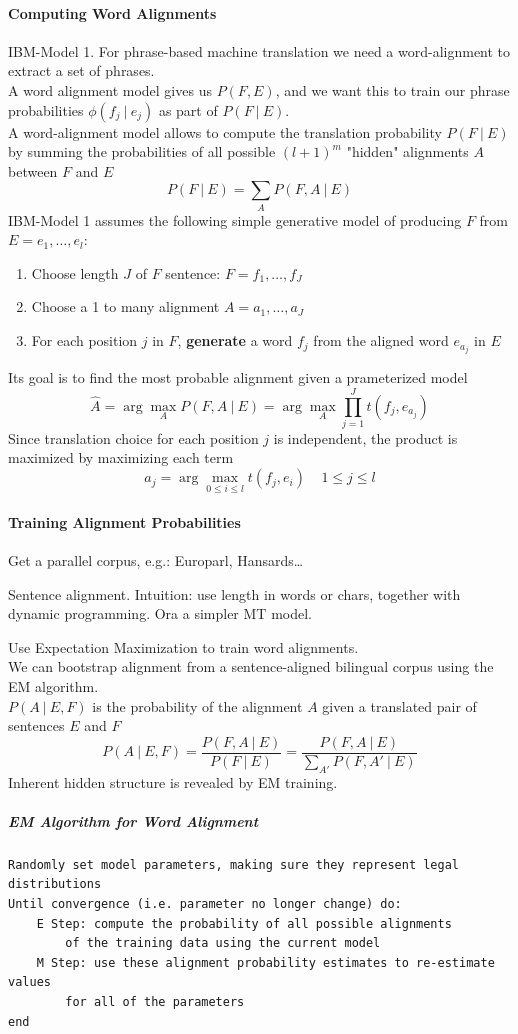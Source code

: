 \documentclass[10pt]{report}
\begin{document}
\paragraph{Computing Word Alignments} IBM-Model 1. For phrase-based machine translation we need a word-alignment to extract a set of phrases.\\
A word alignment model gives us $P(F,E)$, and we want this to train our phrase probabilities $\phi(f_j\:|\:e_j)$ as part of $P(F\:|\:E)$.\\
A word-alignment model allows to compute the translation probability $P(F\:|\:E)$ by summing the probabilities of all possible $(l+1)^m$ "hidden" alignments $A$ between $F$ and $E$
$$P(F\:|\:E) = \sum_A P(F, A\:|\:E)$$
IBM-Model 1 assumes the following simple generative model of producing $F$ from $E=e_1,\ldots,e_l$:
\begin{enumerate}
	\item Choose length $J$ of $F$ sentence: $F=f_1,\ldots,f_J$
	\item Choose a 1 to many alignment $A=a_1,\ldots,a_J$
	\item For each position $j$ in $F$, \textbf{generate} a word $f_j$ from the aligned word $e_{a_j}$ in $E$
\end{enumerate}
Its goal is to find the most probable alignment given a prameterized model
$$\hat{A}=\arg\max_A P(F,A\:|\:E) = \arg\max_A\prod_{j=1}^J t(f_j,e_{a_j})$$
Since translation choice for each position $j$ is independent, the product is maximized by maximizing each term
$$a_j = \arg\max_{0\leq i\leq l} t(f_j,e_i)\:\:\:\:\:1\leq j\leq l$$
\paragraph{Training Alignment Probabilities}\begin{list}{}{}
	\item Get a parallel corpus, e.g.: Europarl, Hansards\ldots
	\item Sentence alignment. Intuition: use length in words or chars, together with dynamic programming. Ora a simpler MT model.
	\item Use Expectation Maximization to train word alignments.\\
	We can bootstrap alignment from a sentence-aligned bilingual corpus using the EM algorithm.\\
	$P(A\:|\:E,F)$ is the probability of the alignment $A$ given a translated pair of sentences $E$ and $F$
	$$P(A\:|\:E,F) = \frac{P(F,A\:|\:E)}{P(F\:|\:E)} =\frac{P(F,A\:|\:E)}{\sum_{A'}P(F,A'\:|\:E)}$$
	Inherent hidden structure is revealed by EM training.
\end{list}
\subparagraph{EM Algorithm for Word Alignment}\begin{lstlisting}
Randomly set model parameters, making sure they represent legal distributions
Until convergence (i.e. parameter no longer change) do:
	E Step: compute the probability of all possible alignments
		of the training data using the current model
	M Step: use these alignment probability estimates to re-estimate values
		for all of the parameters
end
\end{lstlisting}
\end{document}
